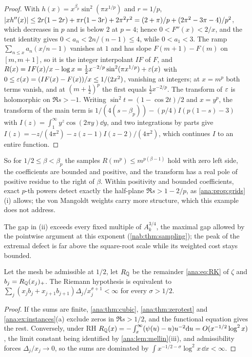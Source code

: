 \begin{proof}
With $h(x)=x^{\beta_p}\sin^2(\pi x^{1/p})$ and $r=1/p$,
$\lvert xh''(x)\rvert\le2r(1-2r)+\pi r(1-3r)+2\pi^2r^2=(2+\pi)/p+(2\pi^2-3\pi-4)/p^2$, which decreases in
$p$ and is below $2$ at $p=4$; hence $0<F''(x)<2/x$, and the tent identity gives
$0<a_n<2n/(n-1)\le4$, while $0<a_1<3$. The ramp $\sum_{n\le x}a_n(x/n-1)$ vanishes at $1$ and has
slope $F(m+1)-F(m)$ on $[m,m+1]$, so it is the integer interpolant $IF$ of $F$, and
$R(x)=IF(x)/x-\log x=\frac12x^{-2/p}\sin^2(\pi x^{1/p})+\varepsilon(x)$ with
$0\le\varepsilon(x)=(IF(x)-F(x))/x\le1/(2x^2)$, vanishing at integers; at $x=m^p$ both terms vanish,
and at $(m+\frac12)^p$ the first equals $\frac12x^{-2/p}$. The transform of $\varepsilon$ is
holomorphic on $\Re s>-1$. Writing $\sin^2t=(1-\cos2t)/2$ and $x=y^p$, the transform of the
main term is $1/(4(s-\beta_p))-(p/4)I(p(1-s)-3)$ with $I(z)=\int_1^\infty y^z\cos(2\pi y)\dd y$,
and two integrations by parts give $I(z)=-z/(4\pi^2)-z(z-1)I(z-2)/(4\pi^2)$, which continues
$I$ to an entire function.
\end{proof}

So for $1/2\le\beta<\beta_p$ the samples $R(m^p)\le m^{p(\beta-1)}$ hold with zero left side,
the coefficients are bounded and positive, and the transform has a real pole of positive residue
to the right of $\beta$. Within positivity and bounded coefficients, exact $p$-th powers detect
exactly the half-plane $\Re s>1-2/p$, as \cref{ana:prop:grids}(i) allows; the von Mangoldt
weights carry more structure, which this example does not address.

The gap in (ii) exceeds every fixed multiple of $A_k^{3/4}$, the maximal gap allowed by the
pointwise argument at this exponent (\cref{nab:thm:sampling}); the peak of the extremal defect
is far above the square-root scale while its weighted cost stays bounded.

\begin{corollary}\label{ana:cor:rhmesh}
Let the mesh be admissible at $1/2$, let $R_{\mathbb{Q}}$ be the remainder \eqref{ana:eq:RK} of $\zeta$
and $b_j=R_{\mathbb{Q}}(x_j)_+$. The Riemann hypothesis is equivalent to
$\sum_j(x_jb_j+x_{j+1}b_{j+1})\Delta_j/x_j^{\sigma+1}<\infty$ for every $\sigma>1/2$.
\end{corollary}

\begin{proof}
If the sums are finite, \cref{ana:thm:cubic}, \cref{ana:thm:zerotest} and
\cref{ana:ex:instances}(a) exclude zeros in $\Re s>1/2$, and the functional equation gives the
rest. Conversely, under RH
$R_{\mathbb{Q}}(x)=-\int_x^\infty(\psi(u)-u)u^{-2}\mathrm{d} u=O(x^{-1/2}\log^2x)$, the limit constant being
identified by \cref{ana:lem:mellin}(iii), and admissibility forces $\Delta_j/x_j\to0$, so the sums
are dominated by $\int x^{-1/2-\sigma}\log^2x\,\dd x<\infty$.
\end{proof}

